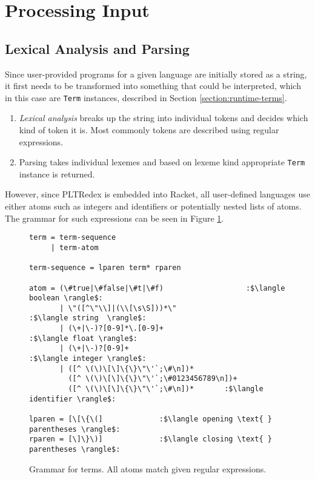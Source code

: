 \section{Processing Input}
\label{section:lex-parse}

\subsection{Lexical Analysis and Parsing}
Since user-provided programs for a given language are initially stored as a string, it first needs to be transformed into something that could be interpreted, which in this case are \texttt{Term} instances, described in Section \ref{section:runtime-terms}. 

\begin{enumerate}
\item
\textit{Lexical analysis} breaks up the string into individual tokens and decides which kind of token it is. Most commonly tokens are described using regular expressions. 
\item 
Parsing takes individual lexemes and based on lexeme kind appropriate \texttt{Term} instance is returned.
\end{enumerate}

However, since PLTRedex is embedded into Racket, all user-defined languages use either atoms such as integers and identifiers or potentially nested lists of atoms. The grammar for such expressions can be seen in Figure \ref{tok-lex-grammar}.

\begin{figure}[h]
\begin{verbatim}
term = term-sequence 
     | term-atom

term-sequence = lparen term* rparen

atom = (\#true|\#false|\#t|\#f)					  :$\langle boolean \rangle$:
	   | \"([^\"\\]|(\\[\s\S]))*\"				   :$\langle string  \rangle$:
	   | (\+|\-)?[0-9]*\.[0-9]+					    :$\langle float \rangle$:
	   | (\+|\-)?[0-9]+							        :$\langle integer \rangle$:
	   | ([^ \(\)\[\]\{\}\"\'`;\#\n])*
	     ([^ \(\)\[\]\{\}\"\'`;\#0123456789\n])+ 
	     ([^ \(\)\[\]\{\}\"\'`;\#\n])*       :$\langle identifier \rangle$:

lparen = [\[\{\(]             :$\langle opening \text{ } parentheses \rangle$:
rparen = [\]\}\)]             :$\langle closing \text{ } parentheses \rangle$:
\end{verbatim} 
\caption{Grammar for terms. All atoms match given regular expressions.}
\label{tok-lex-grammar}
\end{figure}

